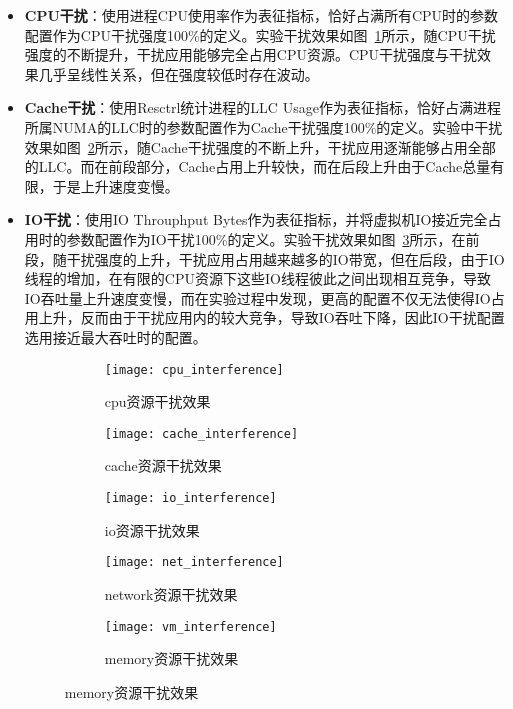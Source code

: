 \begin{itemize}
    
    \item \textbf{CPU干扰}：使用进程CPU使用率作为表征指标，恰好占满所有CPU时的参数配置作为CPU干扰强度100\%的定义。实验干扰效果如图~\ref{fig:cpu_interference}所示，随CPU干扰强度的不断提升，干扰应用能够完全占用CPU资源。CPU干扰强度与干扰效果几乎呈线性关系，但在强度较低时存在波动。
    
    \item \textbf{Cache干扰}：使用Resctrl统计进程的LLC Usage作为表征指标，恰好占满进程所属NUMA的LLC时的参数配置作为Cache干扰强度100\%的定义。实验中干扰效果如图~\ref{fig:cache_interference}所示，随Cache干扰强度的不断上升，干扰应用逐渐能够占用全部的LLC。而在前段部分，Cache占用上升较快，而在后段上升由于Cache总量有限，于是上升速度变慢。

    \item \textbf{IO干扰}：使用IO Throuphput Bytes作为表征指标，并将虚拟机IO接近完全占用时的参数配置作为IO干扰100\%的定义。实验干扰效果如图~\ref{fig:io_interference}所示，在前段，随干扰强度的上升，干扰应用占用越来越多的IO带宽，但在后段，由于IO线程的增加，在有限的CPU资源下这些IO线程彼此之间出现相互竞争，导致IO吞吐量上升速度变慢，而在实验过程中发现，更高的配置不仅无法使得IO占用上升，反而由于干扰应用内的较大竞争，导致IO吞吐下降，因此IO干扰配置选用接近最大吞吐时的配置。

\begin{figure}[H]
  \centering
  \begin{subfigure}[b]{0.32\textwidth}
    \texttt{[image: cpu\_interference]}
    \caption{cpu资源干扰效果}
    \label{fig:cpu_interference}
  \end{subfigure}
  \begin{subfigure}[b]{0.32\textwidth}
    \texttt{[image: cache\_interference]}
    \caption{cache资源干扰效果}
    \label{fig:cache_interference}
  \end{subfigure}
  \begin{subfigure}[b]{0.32\textwidth}
    \texttt{[image: io\_interference]}
    \caption{io资源干扰效果}
    \label{fig:io_interference}
  \end{subfigure}
  \begin{subfigure}[b]{0.32\textwidth}
    \texttt{[image: net\_interference]}
    \caption{network资源干扰效果}
    \label{fig:net_interference}
  \end{subfigure}
  \begin{subfigure}[b]{0.32\textwidth}
    \texttt{[image: vm\_interference]}
    \caption{memory资源干扰效果}
    \label{fig:vm_interference}
  \end{subfigure}
  \label{fig:interference}
\end{figure}


\end{itemize}
